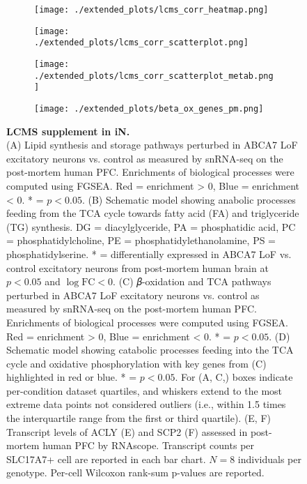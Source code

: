 \begin{figure}[ht]
    \begin{subfigure}[t]{0.5\textwidth}
        \caption{}
        \texttt{[image: ./extended\_plots/lcms\_corr\_heatmap.png]}        
    \end{subfigure}  
    \begin{subfigure}[t]{0.5\textwidth}
        \caption{}
        \texttt{[image: ./extended\_plots/lcms\_corr\_scatterplot.png]}        
    \end{subfigure}  
    \begin{subfigure}[t]{0.5\textwidth}
        \caption{}
        \texttt{[image: ./extended\_plots/lcms\_corr\_scatterplot\_metab.png]}        
    \end{subfigure}  
    \begin{subfigure}[t]{0.5\textwidth}
        \caption{}
        \texttt{[image: ./extended\_plots/beta\_ox\_genes\_pm.png]}        
    \end{subfigure}  
    \caption{
        \textbf{LCMS supplement in iN.}\\[1ex]
        (A) Lipid synthesis and storage pathways perturbed in ABCA7 LoF excitatory neurons vs. control as measured by snRNA-seq on the post-mortem human PFC. Enrichments of biological processes were computed using FGSEA. Red = enrichment > 0, Blue = enrichment < 0. * = $p<0.05$. 
        (B) Schematic model showing anabolic processes feeding from the TCA cycle towards fatty acid (FA) and triglyceride (TG) synthesis. DG = diacylglyceride, PA = phosphatidic acid, PC = phosphatidylcholine, PE = phosphatidylethanolamine, PS = phosphatidylserine. * = differentially expressed in ABCA7 LoF vs. control excitatory neurons from post-mortem human brain at $p<0.05$ and $\log\text{FC}<0$. 
        (C) 𝛽-oxidation and TCA pathways perturbed in ABCA7 LoF excitatory neurons vs. control as measured by snRNA-seq on the post-mortem human PFC. Enrichments of biological processes were computed using FGSEA. Red = enrichment > 0, Blue = enrichment < 0. * = $p<0.05$. 
        (D) Schematic model showing catabolic processes feeding into the TCA cycle and oxidative phosphorylation with key genes from (C) highlighted in red or blue. * = $p<0.05$. For (A, C,) boxes indicate per-condition dataset quartiles, and whiskers extend to the most extreme data points not considered outliers (i.e., within 1.5 times the interquartile range from the first or third quartile). 
        (E, F) Transcript levels of ACLY (E) and SCP2 (F) assessed in post-mortem human PFC by RNAscope. Transcript counts per SLC17A7+ cell are reported in each bar chart. $N = 8$ individuals per genotype. Per-cell Wilcoxon rank-sum p-values are reported.
    }
    \label{fig:lipid_mitochondrial_perturbations}
\end{figure}

